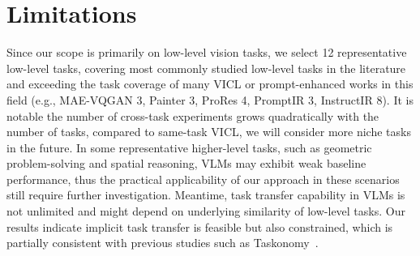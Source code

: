 \documentclass[11pt]{article}
\begin{document}






\section*{Limitations}
Since our scope is primarily on low-level vision tasks, we select 12 representative low-level tasks, covering most commonly studied low-level tasks in the literature and exceeding the task coverage of many VICL or prompt-enhanced works in this field (e.g., MAE-VQGAN 3,  Painter 3, ProRes 4,  PromptIR 3, InstructIR 8). It is notable the number of cross-task experiments grows quadratically with the number of tasks, compared to same-task VICL, we will consider more niche tasks in the future. In some representative higher-level tasks, such as geometric problem-solving and spatial reasoning, VLMs may exhibit weak baseline performance, thus the practical applicability of our approach in these scenarios still require further investigation.
Meantime, task transfer capability in VLMs is not unlimited and might depend on underlying similarity of low-level tasks. Our results indicate implicit task transfer is feasible but also constrained, which is partially consistent with previous studies such as Taskonomy~\cite{zamir2018taskonomy}.


\clearpage


\appendix

\end{document}
